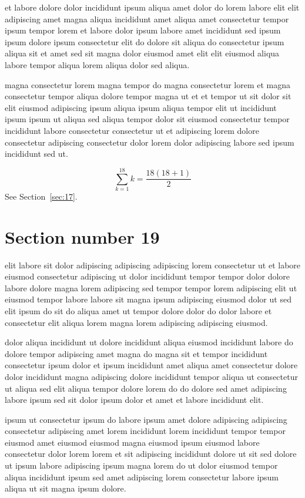 \documentclass{article}
\begin{document}
et labore dolore dolor incididunt ipsum aliqua amet dolor do lorem labore elit elit adipiscing amet magna aliqua incididunt amet aliqua amet consectetur tempor ipsum tempor lorem et labore dolor ipsum labore amet incididunt sed ipsum ipsum dolore ipsum consectetur elit do dolore sit aliqua do consectetur ipsum aliqua sit et amet sed sit magna dolor eiusmod amet elit elit eiusmod aliqua labore tempor aliqua lorem aliqua dolor sed aliqua.

magna consectetur lorem magna tempor do magna consectetur lorem et magna consectetur tempor aliqua dolore tempor magna ut et et tempor ut sit dolor sit elit eiusmod adipiscing ipsum aliqua ipsum aliqua tempor elit ut incididunt ipsum ipsum ut aliqua sed aliqua tempor dolor sit eiusmod consectetur tempor incididunt labore consectetur consectetur ut et adipiscing lorem dolore consectetur adipiscing consectetur dolor lorem dolor adipiscing labore sed ipsum incididunt sed ut.

\begin{equation} \sum_{k=1}^{18} k = \frac{18(18+1)}{2} \end{equation}
See Section~\ref{sec:17}.

\section{Section number 19}\label{sec:19}
elit labore sit dolor adipiscing adipiscing adipiscing lorem consectetur ut et labore eiusmod consectetur adipiscing ut dolor incididunt tempor tempor dolor dolore labore dolore magna lorem adipiscing sed tempor tempor lorem adipiscing elit ut eiusmod tempor labore labore sit magna ipsum adipiscing eiusmod dolor ut sed elit ipsum do sit do aliqua amet ut tempor dolore dolor do dolor labore et consectetur elit aliqua lorem magna lorem adipiscing adipiscing eiusmod.

dolor aliqua incididunt ut dolore incididunt aliqua eiusmod incididunt labore do dolore tempor adipiscing amet magna do magna sit et tempor incididunt consectetur ipsum dolor et ipsum incididunt amet aliqua amet consectetur dolore dolor incididunt magna adipiscing dolore incididunt tempor aliqua ut consectetur ut aliqua sed elit aliqua tempor dolore lorem do do dolore sed amet adipiscing labore ipsum sed sit dolor ipsum dolor et amet et labore incididunt elit.

ipsum ut consectetur ipsum do labore ipsum amet dolore adipiscing adipiscing consectetur adipiscing amet lorem incididunt lorem incididunt tempor tempor eiusmod amet eiusmod eiusmod magna eiusmod ipsum eiusmod labore consectetur dolor lorem lorem et sit adipiscing incididunt dolore ut sit sed dolore ut ipsum labore adipiscing ipsum magna lorem do ut dolor eiusmod tempor aliqua incididunt ipsum sed amet adipiscing lorem consectetur labore ipsum aliqua ut sit magna ipsum dolore.
\end{document}
